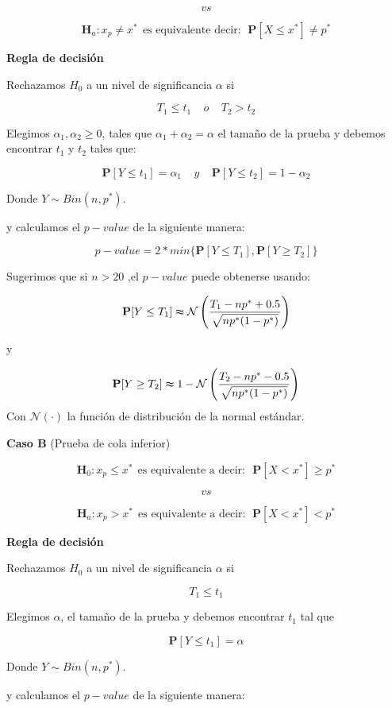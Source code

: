 \documentclass[
  a4paper,
  oneside,
  openany]{book}
\begin{document}
\[vs\]

\[\textbf{H}_a: x_{p} \neq x^* \ \ \mbox{es equivalente  decir}: \ \ \mathbf{P}[X \leq x^*]\neq p^*\]

\textbf{Regla de decisión}

Rechazamos \(H_0\) a un nivel de significancia \(\alpha\) si

\[T_{1}\leq t_{1} \ \ \ \ \  o   \ \ \ \ \ T_{2}>t_{2}\]

Elegimos \(\alpha_{1},\alpha_{2}\geq 0\), tales que \(\alpha_{1}+\alpha_{2}=\alpha\) el tamaño de la prueba y debemos encontrar \(t_{1}\) y \(t_{2}\) tales que:

\[\mathbf{P}[Y \leq t_{1}]=\alpha_{1} \ \ \ \ \  y  \ \ \ \ \ \mathbf{P}[Y \leq t_{2}]=1-\alpha_{2}\]

Donde \(Y \sim Bin (n,p^*)\).

y calculamos el \(p-value\) de la siguiente manera:

\[p-value=2*min \{ \mathbf{P}[Y\leq T_{1}],\mathbf{P}[Y \geq T_{2}] \}\]

Sugerimos que si \(n > 20\) ,el \(p-value\) puede obtenerse usando:

\[\mathbf{P}[Y\leq T_{1}] \thickapprox \mathcal{N}\left(\frac{T_{1}-np^*+0.5}{\sqrt{np^*(1-p^*)}}\right)\]

y

\[\mathbf{P}[Y\geq T_{2}] \thickapprox 1-\mathcal{N} \left(\frac{T_{2}-np^*-0.5}{\sqrt{np^*(1-p^*)}}\right)\]
Con \(\mathcal{N}(\cdot)\) la función de distribución de la normal estándar.

\textbf{Caso B} (Prueba de cola inferior)

\[\textbf{H}_0: x_{p} \leq x^* \ \ \mbox{es equivalente a decir:} \ \ \ \mathbf{P}[X < x^*]\geq p^*\]

\[vs\]

\[\textbf{H}_a: x_{p} > x^* \ \  \mbox{es equivalente a decir}: \ \ \mathbf{P}[X < x^*]< p^*\]

\textbf{Regla de decisión}

Rechazamos \(H_0\) a un nivel de significancia \(\alpha\) si

\[T_{1} \leq t_{1}\]

Elegimos \(\alpha\), el tamaño de la prueba y debemos encontrar \(t_{1}\) tal que

\[\mathbf{P}[Y \leq t_{1}]=\alpha\]

Donde \(Y \sim Bin (n,p^*)\).

y calculamos el \(p-value\) de la siguiente manera:
\end{document}
